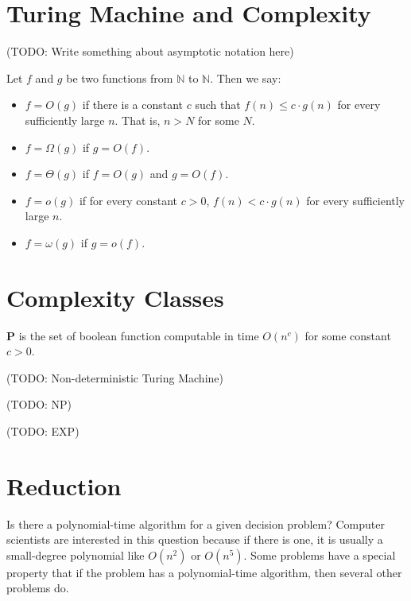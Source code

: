 

    \section{Turing Machine and Complexity}
        (TODO: Write something about asymptotic notation here)
        
        \begin{defn} \label{def_bigo}
            Let $f$ and $g$ be two functions from $\mathbb{N}$ to $\mathbb{N}$. Then we say: \begin{itemize}
                \item $f=O(g)$ if there is a constant $c$ such that $f(n) \leq c \cdot g(n)$ for every sufficiently large $n$. That is, $n>N$ for some $N$.
                \item $f=\Omega(g)$ if $g=O(f)$.
                \item $f=\Theta(g)$ if $f=O(g)$ and $g=O(f)$.
                \item $f=o(g)$ if for every constant $c>0$, $f(n) < c \cdot g(n)$ for every sufficiently large $n$.
                \item $f=\omega(g)$ if $g=o(f)$.
            \end{itemize} 
        \end{defn}
        
    \section {Complexity Classes}
        \begin{defn}[P] \label{def_comp_p}
        $\mathbf{P}$ is the set of boolean function computable in time $O(n^c)$ for some constant $c>0$.
        \end{defn}
        
        (TODO: Non-deterministic Turing Machine)
        
        (TODO: NP)
        
        (TODO: EXP)
    
    \section {Reduction}
        Is there a polynomial-time algorithm for a given decision problem? Computer scientists are interested in this question because if there is one, it is usually a small-degree polynomial like $O(n^2)$ or $O(n^5)$. Some problems have a special property that if the problem has a polynomial-time algorithm, then several other problems do.
        
